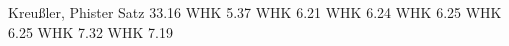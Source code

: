 \begin{thebibliography}{9}
 Kreu\ss ler, Phister Satz 33.16
 WHK 5.37
 WHK 6.21
 WHK 6.24
 WHK 6.25
 WHK 6.25
 WHK 7.32
 WHK 7.19
\end{thebibliography}
